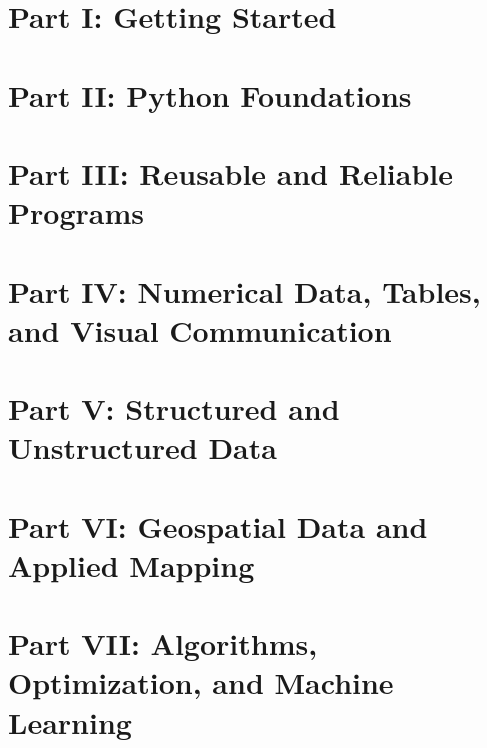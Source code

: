\documentclass{textbook}
\providecommand{\toc}{\tableofcontents}
\begin{document}

\newpage

\label{book:toc}
\toc
\newpage


\newpage

\part{Part I: Getting Started}


\part{Part II: Python Foundations}





\part{Part III: Reusable and Reliable Programs}






\part{Part IV: Numerical Data, Tables, and Visual Communication}




\part{Part V: Structured and Unstructured Data}


\part{Part VI: Geospatial Data and Applied Mapping}



\part{Part VII: Algorithms, Optimization, and Machine Learning}








\end{document}
